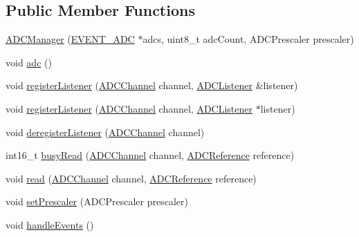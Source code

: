 \subsection*{Public Member Functions}
\begin{DoxyCompactItemize}
\item 
\hyperlink{classflame_1_1_a_d_c_manager_ad9113599803b23bb74fcaf1e50e5d6a4}{A\-D\-C\-Manager} (\hyperlink{namespaceflame_a0fb9cd960c9db48d9e068daa2427aecf}{E\-V\-E\-N\-T\-\_\-\-A\-D\-C} $\ast$adcs, uint8\-\_\-t adc\-Count, A\-D\-C\-Prescaler prescaler)
\item 
void \hyperlink{classflame_1_1_a_d_c_manager_a604cce5bd959bc084896e033d722e973}{adc} ()
\item 
void \hyperlink{classflame_1_1_a_d_c_manager_abbc89646e31553473b48ccacf8c3e05b}{register\-Listener} (\hyperlink{atmega1280_8h_ab5a361d214bf33f4d9d443d9db44043d}{A\-D\-C\-Channel} channel, \hyperlink{classflame_1_1_a_d_c_listener}{A\-D\-C\-Listener} \&listener)
\item 
void \hyperlink{classflame_1_1_a_d_c_manager_ab1d6a02fb4b94d38471f720396bc0040}{register\-Listener} (\hyperlink{atmega1280_8h_ab5a361d214bf33f4d9d443d9db44043d}{A\-D\-C\-Channel} channel, \hyperlink{classflame_1_1_a_d_c_listener}{A\-D\-C\-Listener} $\ast$listener)
\item 
void \hyperlink{classflame_1_1_a_d_c_manager_a1fa15eac782858bd521ab5ea3ee7a913}{deregister\-Listener} (\hyperlink{atmega1280_8h_ab5a361d214bf33f4d9d443d9db44043d}{A\-D\-C\-Channel} channel)
\item 
int16\-\_\-t \hyperlink{classflame_1_1_a_d_c_manager_a3ee8ed7fbe1bc144f2521bc725527d84}{busy\-Read} (\hyperlink{atmega1280_8h_ab5a361d214bf33f4d9d443d9db44043d}{A\-D\-C\-Channel} channel, \hyperlink{atmega1280_8h_ad19819a3e7273f98d571eab79f5a5d81}{A\-D\-C\-Reference} reference)
\item 
void \hyperlink{classflame_1_1_a_d_c_manager_aaef66297e65aa489c1493f55275f84a4}{read} (\hyperlink{atmega1280_8h_ab5a361d214bf33f4d9d443d9db44043d}{A\-D\-C\-Channel} channel, \hyperlink{atmega1280_8h_ad19819a3e7273f98d571eab79f5a5d81}{A\-D\-C\-Reference} reference)
\item 
void \hyperlink{classflame_1_1_a_d_c_manager_a010eb23bc134b08b372982e7ee6b17d4}{set\-Prescaler} (A\-D\-C\-Prescaler prescaler)
\item 
void \hyperlink{classflame_1_1_a_d_c_manager_abc84178ae84687965312bf5ed79667b4}{handle\-Events} ()
\end{DoxyCompactItemize}
